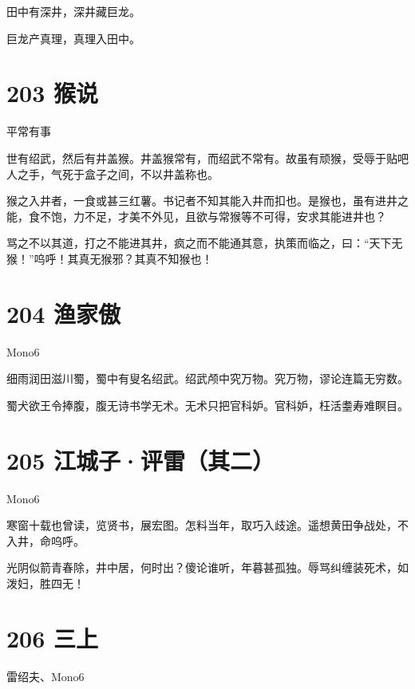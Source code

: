 \documentclass[UTF8,12pt,oneside]{ctexbook}
\begin{document}
        \begin{center}
        田中有深井，深井藏巨龙。
        
        巨龙产真理，真理入田中。
        \end{center}

        \section{203 猴说}
        \begin{center}
            平常有事
        \end{center}
        
        世有绍武，然后有井盖猴。井盖猴常有，而绍武不常有。故虽有顽猴，受辱于贴吧人之手，气死于盒子之间，不以井盖称也。
        
        猴之入井者，一食或甚三红薯。书记者不知其能入井而扣也。是猴也，虽有进井之能，食不饱，力不足，才美不外见，且欲与常猴等不可得，安求其能进井也？
        
        骂之不以其道，打之不能进其井，疯之而不能通其意，执策而临之，曰：“天下无猴！”呜呼！其真无猴邪？其真不知猴也！

        \section{204 渔家傲}
        \begin{center}
            Mono6
        \end{center}
        
        细雨润田滋川蜀，蜀中有叟名绍武。绍武颅中究万物。究万物，谬论连篇无穷数。
        
        蜀犬欲王令捧腹，腹无诗书学无术。无术只把官科妒。官科妒，枉活耋寿难瞑目。
        
        \section{205 江城子·评雷（其二）}
        \begin{center}
            Mono6
        \end{center}
        
        寒窗十载也曾读，览贤书，展宏图。怎料当年，取巧入歧途。遥想黄田争战处，不入井，命呜呼。
        
        光阴似箭青春除，井中居，何时出？傻论谁听，年暮甚孤独。辱骂纠缠装死术，如泼妇，胜四无！
        ~\\

        \section{206 三上}
        \begin{center}
            雷绍夫、Mono6
        \end{center}
        
\end{document}
